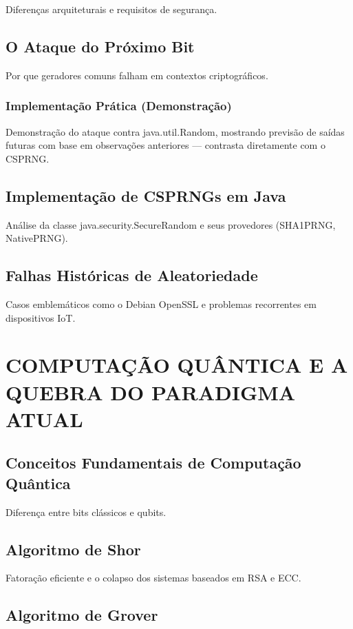 \documentclass[
	12pt,				%
	openright,			%
	oneside,			%
	a4paper,			%
	portuguese,			%
	brazil				%
	]{abntex2}
\begin{document}
Diferenças arquiteturais e requisitos de segurança.

\section{O Ataque do Próximo Bit}

Por que geradores comuns falham em contextos criptográficos.

\subsection{Implementação Prática (Demonstração)}

Demonstração do ataque contra java.util.Random, mostrando previsão de saídas futuras com base em observações anteriores — contrasta diretamente com o CSPRNG.

\section{Implementação de CSPRNGs em Java}

Análise da classe java.security.SecureRandom e seus provedores (SHA1PRNG, NativePRNG).

\section{Falhas Históricas de Aleatoriedade}

Casos emblemáticos como o Debian OpenSSL e problemas recorrentes em dispositivos IoT.

\chapter{COMPUTAÇÃO QUÂNTICA E A QUEBRA DO PARADIGMA ATUAL} %

\section{Conceitos Fundamentais de Computação Quântica}

Diferença entre bits clássicos e qubits.

\section{Algoritmo de Shor}

Fatoração eficiente e o colapso dos sistemas baseados em RSA e ECC.

\section{Algoritmo de Grover}
\end{document}
